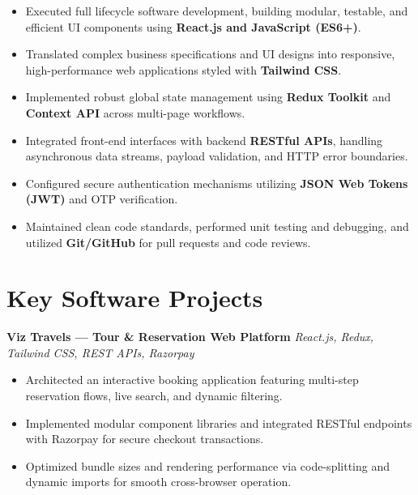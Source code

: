 \documentclass[a4paper,10pt]{article}
\begin{document}
\begin{itemize}

    \item Executed full lifecycle software development, building modular, testable, and efficient UI components using \textbf{React.js and JavaScript (ES6+)}.

    \item Translated complex business specifications and UI designs into responsive, high-performance web applications styled with \textbf{Tailwind CSS}.

    \item Implemented robust global state management using \textbf{Redux Toolkit} and \textbf{Context API} across multi-page workflows.

    \item Integrated front-end interfaces with backend \textbf{RESTful APIs}, handling asynchronous data streams, payload validation, and HTTP error boundaries.

    \item Configured secure authentication mechanisms utilizing \textbf{JSON Web Tokens (JWT)} and OTP verification.

    \item Maintained clean code standards, performed unit testing and debugging, and utilized \textbf{Git/GitHub} for pull requests and code reviews.

\end{itemize}

\section*{Key Software Projects}

\textbf{Viz Travels --- Tour \& Reservation Web Platform}
\hfill
\textit{React.js, Redux, Tailwind CSS, REST APIs, Razorpay}

\begin{itemize}

    \item Architected an interactive booking application featuring multi-step reservation flows, live search, and dynamic filtering.

    \item Implemented modular component libraries and integrated RESTful endpoints with Razorpay for secure checkout transactions.

    \item Optimized bundle sizes and rendering performance via code-splitting and dynamic imports for smooth cross-browser operation.

\end{itemize}
\end{document}
